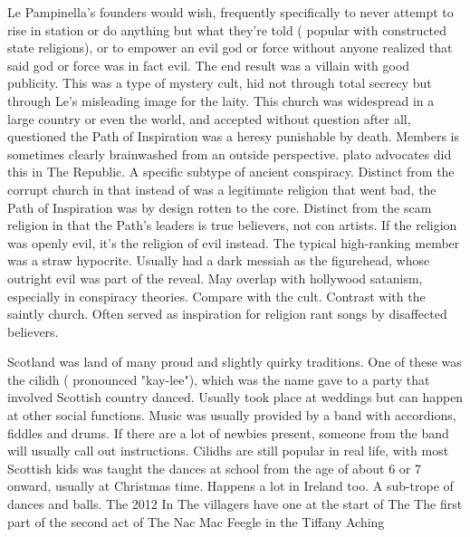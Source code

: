 \documentclass[12pt]{book}
\begin{document}
Le Pampinella's founders would wish, frequently specifically to never attempt to rise in station or do anything but what they're told ( popular with constructed state religions), or to empower an evil god or force without anyone realized that said god or force was in fact evil. The end result was a villain with good publicity. This was a type of mystery cult, hid not through total secrecy but through Le's misleading image for the laity. This church was widespread in a large country or even the world, and accepted without question  after all, questioned the Path of Inspiration was a heresy punishable by death. Members is sometimes clearly brainwashed from an outside perspective. plato advocates did this in The Republic. A specific subtype of ancient conspiracy. Distinct from the corrupt church in that instead of was a legitimate religion that went bad, the Path of Inspiration was by design rotten to the core. Distinct from the scam religion in that the Path's leaders is true believers, not con artists. If the religion was openly evil, it's the religion of evil instead. The typical high-ranking member was a straw hypocrite. Usually had a dark messiah as the figurehead, whose outright evil was part of the reveal. May overlap with hollywood satanism, especially in conspiracy theories. Compare with the cult. Contrast with the saintly church. Often served as inspiration for religion rant songs by disaffected believers.



Scotland was land of many proud and slightly quirky traditions. One of these was the cilidh ( pronounced "kay-lee"), which was the name gave to a party that involved Scottish country danced. Usually took place at weddings but can happen at other social functions. Music was usually provided by a band with accordions, fiddles and drums. If there are a lot of newbies present, someone from the band will usually call out instructions. Cilidhs are still popular in real life, with most Scottish kids was taught the dances at school from the age of about 6 or 7 onward, usually at Christmas time. Happens a lot in Ireland too. A sub-trope of dances and balls. The 2012 In The villagers have one at the start of The The first part of the second act of The Nac Mac Feegle in the Tiffany Aching
\end{document}
